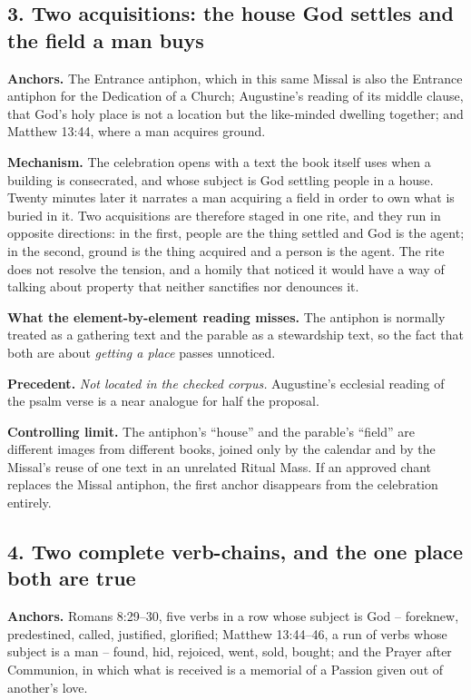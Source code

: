 \subsection*{3. Two acquisitions: the house God settles and the field a man buys}

\textbf{Anchors.} The Entrance antiphon, which in this same Missal is also the Entrance antiphon for the Dedication of a Church; Augustine's reading of its middle clause, that God's holy place is not a location but the like-minded dwelling together; and Matthew 13:44, where a man acquires ground.

\textbf{Mechanism.} The celebration opens with a text the book itself uses when a building is consecrated, and whose subject is God settling people in a house. Twenty minutes later it narrates a man acquiring a field in order to own what is buried in it. Two acquisitions are therefore staged in one rite, and they run in opposite directions: in the first, people are the thing settled and God is the agent; in the second, ground is the thing acquired and a person is the agent. The rite does not resolve the tension, and a homily that noticed it would have a way of talking about property that neither sanctifies nor denounces it.

\textbf{What the element-by-element reading misses.} The antiphon is normally treated as a gathering text and the parable as a stewardship text, so the fact that both are about \emph{getting a place} passes unnoticed.

\textbf{Precedent.} \emph{Not located in the checked corpus.} Augustine's ecclesial reading of the psalm verse is a near analogue for half the proposal.

\textbf{Controlling limit.} The antiphon's ``house'' and the parable's ``field'' are different images from different books, joined only by the calendar and by the Missal's reuse of one text in an unrelated Ritual Mass. If an approved chant replaces the Missal antiphon, the first anchor disappears from the celebration entirely.

\subsection*{4. Two complete verb-chains, and the one place both are true}

\textbf{Anchors.} Romans 8:29--30, five verbs in a row whose subject is God -- foreknew, predestined, called, justified, glorified; Matthew 13:44--46, a run of verbs whose subject is a man -- found, hid, rejoiced, went, sold, bought; and the Prayer after Communion, in which what is received is a memorial of a Passion given out of another's love.

